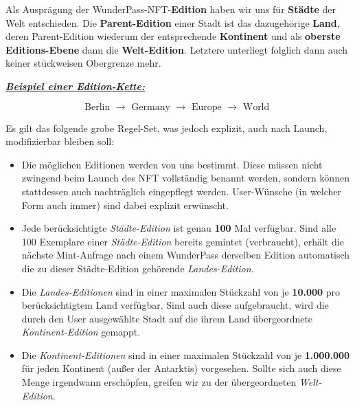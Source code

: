 \begin{NFT-Prop}[Edition]

Als Ausprägung der WunderPass-NFT-\textbf{Edition} haben wir uns für \textbf{Städte} der Welt entschieden. Die \textbf{Parent-Edition} einer Stadt ist das dazugehörige \textbf{Land}, deren 
Parent-Edition wiederum der entsprechende \textbf{Kontinent} und als \textbf{oberste Editions-Ebene} dann die \textbf{Welt-Edition}. Letztere unterliegt folglich dann auch keiner stückweisen Obergrenze mehr.

\vspace{0.2cm}

\underline{\textbf{\textit{Beispiel einer Edition-Kette:}}}

\vspace{0.2cm}

\begin{equation*}
\textrm{Berlin } \rightarrow \textrm{ Germany } \rightarrow \textrm{ Europe } \rightarrow \textrm{ World }
\end{equation*} 

\vspace{0.2cm}

Es gilt das folgende grobe Regel-Set, was jedoch explizit, auch nach Launch, modifizierbar bleiben soll:

\begin{itemize}
    \item Die möglichen Editionen werden von uns bestimmt. Diese müssen nicht zwingend beim Launch des NFT vollständig benannt werden, sondern können stattdessen auch nachträglich eingepflegt werden. User-Wünsche (in welcher Form auch immer) sind dabei explizit erwünscht.
    \item Jede berücksichtigte \textit{Städte-Edition} ist genau \textbf{100} Mal verfügbar. Sind alle 100 Exemplare einer \textit{Städte-Edition} bereits gemintet (verbraucht), erhält die nächste Mint-Anfrage nach einem WunderPass derselben Edition automatisch die zu dieser Städte-Edition gehörende \textit{Landes-Edition}.
    \item Die \textit{Landes-Editionen} sind in einer maximalen Stückzahl von je \textbf{10.000} pro berücksichtigtem Land verfügbar. Sind auch diese aufgebraucht, wird die durch den User ausgewählte Stadt auf die ihrem Land übergeordnete \textit{Kontinent-Edition} gemappt.
    \item Die \textit{Kontinent-Editionen} sind in einer maximalen Stückzahl von je \textbf{1.000.000} für jeden Kontinent (außer der Antarktis) vorgesehen. Sollte sich auch diese Menge irgendwann erschöpfen, greifen wir zu der übergeordneten \textit{Welt-Edition}.
\end{itemize} 

\end{NFT-Prop}

